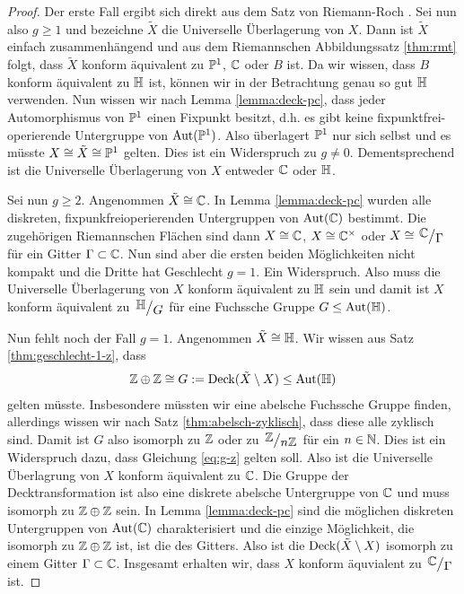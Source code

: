 \begin{proof}
  Der erste Fall ergibt sich direkt aus dem Satz von Riemann-Roch
  \cite[Kor. 16.13]{For}. Sei
  nun also $g \geq 1$ und bezeichne $\tilde X$ die Universelle
  Überlagerung von $X$. Dann ist $\tilde X$ einfach zusammenhängend
  und aus dem Riemannschen Abbildungssatz \ref{thm:rmt} folgt, dass
  $\tilde X$ konform äquivalent zu $\P^1$, $\C$ oder $B$ ist. Da wir
  wissen, dass $B$ konform äquivalent zu $\h$ ist, können wir in der
  Betrachtung genau so gut $\h$ verwenden. Nun wissen wir nach Lemma
  \ref{lemma:deck-pc}, dass jeder Automorphismus von $\P^1$ einen
  Fixpunkt besitzt, d.h. es gibt keine fixpunktfrei-operierende
  Untergruppe von $\Aut(\P^1)$. Also überlagert $\P^1$ nur sich
  selbst und es müsste $X \cong \tilde X \cong \P^1$ gelten. Dies ist
  ein Widerspruch zu $g \neq 0$. Dementsprechend ist die Universelle Überlagerung
  von $X$ entweder $\C$ oder $\h$.

  Sei nun $g \geq 2$. Angenommen $\tilde X \cong \C$. In Lemma
  \ref{lemma:deck-pc} wurden alle diskreten, fixpunkfreioperierenden
  Untergruppen von $\Aut(\C)$ bestimmt. Die zugehörigen Riemannschen
  Flächen sind dann $X \cong \C$, $X \cong \C^\times$ oder $X \cong
  \quot{\C}{\Gamma}$ für ein Gitter $\Gamma \subset \C$. Nun sind aber
  die ersten beiden Möglichkeiten nicht kompakt und die Dritte hat
  Geschlecht $g =1$. Ein Widerspruch. Also muss die Universelle
  Überlagerung von $X$ konform äquivalent zu $\h$ sein und damit ist
  $X$ konform äquivalent zu $\quot{\h}{G}$ für eine Fuchssche Gruppe $G
  \leq \Aut(\h)$.


  Nun fehlt noch der Fall $g = 1$. Angenommen $\tilde X \cong \h$. Wir
  wissen aus Satz \ref{thm:geschlecht-1-z}, dass
  \begin{align}
    \label{eq:g-z}
  \Z \oplus \Z \cong G := \Deck(\tilde X \setminus X) \leq \Aut(\h)
  \end{align}
  gelten müsste. Insbesondere müssten wir eine abelsche Fuchssche
  Gruppe finden, allerdings wissen wir nach Satz
  \ref{thm:abelsch-zyklisch}, dass diese alle zyklisch sind. Damit ist
  $G$ also isomorph zu $\Z$ oder zu $\quot{\Z}{n\Z}$ für ein $n \in
  \N$. Dies ist ein Widerspruch dazu, dass Gleichung \eqref{eq:g-z}
  gelten soll. Also ist die Universelle Überlagrung von $X$ konform
  äquivalent zu $\C$. Die Gruppe der Decktransformation ist also eine
  diskrete abelsche Untergruppe von $\C$ und muss isomorph zu $\Z
  \oplus \Z$ sein. In Lemma \ref{lemma:deck-pc} sind die möglichen diskreten
  Untergruppen von $\Aut(\C)$ charakterisiert und die einzige Möglichkeit, die
  isomorph zu $\Z \oplus \Z$ ist, ist die des Gitters. Also ist die
  $\Deck(\tilde X \setminus X)$ isomorph zu einem Gitter $\Gamma
  \subset \C$. Insgesamt erhalten wir, dass $X$ konform äquvialent zu
  $\quot{\C}{\Gamma}$ ist.
\end{proof}

